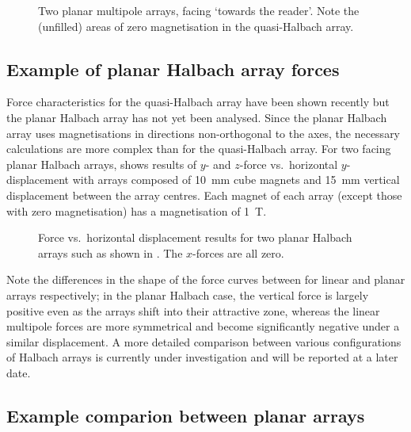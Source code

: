 \documentclass[11pt,a4paper]{memoir}
\begin{document}
\begin{figure}
\centering
{}\hfil
{}
\caption{Two planar multipole arrays, facing `towards the reader'. Note the (unfilled) areas of zero magnetisation in the quasi-Halbach array.}
\end{figure}

\subsection{Example of planar Halbach array forces}

Force characteristics for the quasi-Halbach array have been shown recently \cite{janssen2009-jsdd} but the planar Halbach array has not yet been analysed.
Since the planar Halbach array uses magnetisations in directions non-orthogonal to the axes, the necessary calculations are more complex than for the quasi-Halbach array.
For two facing planar Halbach arrays,  shows results of $y$- and $z$-force vs.\ horizontal $y$-displacement with arrays composed of \SI{10}{mm} cube magnets and \SI{15}{mm} vertical displacement between the array centres.
Each magnet of each array (except those with zero magnetisation) has a magnetisation of \SI{1}{T}.

\begin{figure}
\centering
{}
\caption{Force vs.\ horizontal displacement results for two planar Halbach arrays such as shown in . The $x$-forces are all zero.}
\end{figure}

Note the differences in the shape of the force curves between  for linear and planar arrays respectively; in the planar Halbach case, the vertical force is largely positive even as the arrays shift into their attractive zone, whereas the linear multipole forces are more symmetrical and become significantly negative under a similar displacement.
A more detailed comparison between various configurations of Halbach arrays is currently under investigation and will be reported at a later date.

\subsection{Example comparion between planar arrays}
\end{document}
